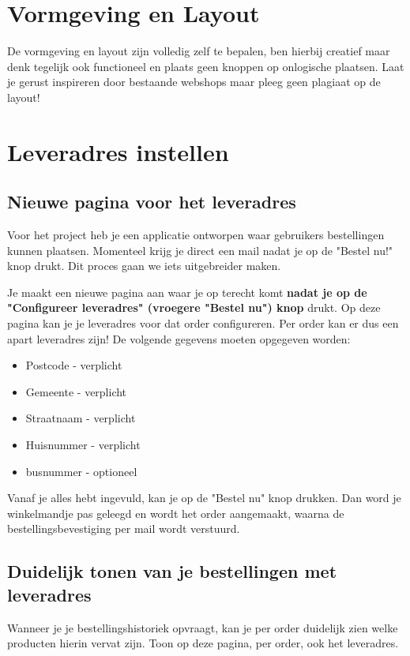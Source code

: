 \documentclass{article}
\begin{document}
\section{Vormgeving en Layout}
De vormgeving en layout zijn volledig zelf te bepalen, ben hierbij creatief maar denk tegelijk ook functioneel en plaats geen knoppen op onlogische plaatsen. Laat je gerust inspireren door bestaande webshops maar pleeg geen plagiaat op de layout! 


\pagebreak

\section{Leveradres instellen}
\subsection{Nieuwe pagina voor het leveradres}

Voor het project heb je een applicatie ontworpen waar gebruikers bestellingen kunnen plaatsen. Momenteel krijg je direct een mail nadat je op de "Bestel nu!" knop drukt. Dit proces gaan we iets uitgebreider maken.

Je maakt een nieuwe pagina aan waar je op terecht komt \textbf{nadat je op de "Configureer leveradres" (vroegere "Bestel nu") knop} drukt. Op deze pagina kan je je leveradres voor dat order configureren. Per order kan er dus een apart leveradres zijn! De volgende gegevens moeten opgegeven worden:
\begin{itemize}
    \item Postcode - verplicht
    \item Gemeente - verplicht
    \item Straatnaam - verplicht
    \item Huisnummer - verplicht
    \item busnummer - optioneel
\end{itemize}

Vanaf je alles hebt ingevuld, kan je op de "Bestel nu" knop drukken. Dan word je winkelmandje pas geleegd en wordt het order aangemaakt, waarna de bestellingsbevestiging per mail wordt verstuurd.

\subsection{Duidelijk tonen van je bestellingen met leveradres}

Wanneer je je bestellingshistoriek opvraagt, kan je per order duidelijk zien welke producten hierin vervat zijn. Toon op deze pagina, per order, ook het leveradres.\\
\end{document}
